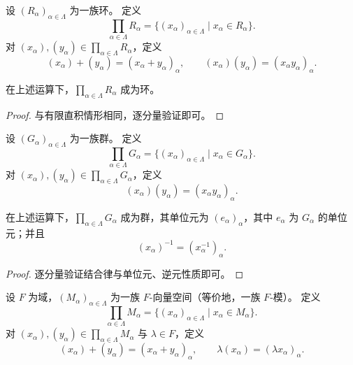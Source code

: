 \documentclass[lang=cn,a4paper,newtx]{elegantbook}
\begin{document}
\begin{definition}[一般直积环]
  设 $(R_{\alpha})_{\alpha\in\Lambda}$ 为一族环。
  定义
  \[
    \prod_{\alpha\in\Lambda} R_{\alpha}=\{(x_{\alpha})_{\alpha\in\Lambda}\mid x_{\alpha}\in R_{\alpha}\}.
  \]
  对 $(x_{\alpha}),(y_{\alpha})\in\prod_{\alpha\in\Lambda}R_{\alpha}$，定义
  \[
    (x_{\alpha})+(y_{\alpha})=(x_{\alpha}+y_{\alpha})_{\alpha},\qquad
    (x_{\alpha})(y_{\alpha})=(x_{\alpha}y_{\alpha})_{\alpha}.
  \]
\end{definition}

\begin{proposition}
  在上述运算下，$\prod_{\alpha\in\Lambda}R_{\alpha}$ 成为环。
\end{proposition}

\begin{proof}
  与有限直积情形相同，逐分量验证即可。
\end{proof}

\begin{definition}[直积群]
  设 $(G_{\alpha})_{\alpha\in\Lambda}$ 为一族群。
  定义
  \[
    \prod_{\alpha\in\Lambda} G_{\alpha}=\{(x_{\alpha})_{\alpha\in\Lambda}\mid x_{\alpha}\in G_{\alpha}\}.
  \]
  对 $(x_{\alpha}),(y_{\alpha})\in\prod_{\alpha\in\Lambda}G_{\alpha}$，定义
  \[
    (x_{\alpha})(y_{\alpha})=(x_{\alpha}y_{\alpha})_{\alpha}.
  \]
\end{definition}

\begin{proposition}
  在上述运算下，$\prod_{\alpha\in\Lambda} G_{\alpha}$ 成为群，其单位元为 $(e_{\alpha})_{\alpha}$，其中 $e_{\alpha}$ 为 $G_{\alpha}$ 的单位元；并且
  \[
    (x_{\alpha})^{-1}=(x_{\alpha}^{-1})_{\alpha}.
  \]
\end{proposition}

\begin{proof}
  逐分量验证结合律与单位元、逆元性质即可。
\end{proof}

\begin{definition}
  设 $F$ 为域，$(M_{\alpha})_{\alpha\in\Lambda}$ 为一族 $F$-向量空间（等价地，一族 $F$-模）。
  定义
  \[
    \prod_{\alpha\in\Lambda} M_{\alpha}=\{(x_{\alpha})_{\alpha\in\Lambda}\mid x_{\alpha}\in M_{\alpha}\}.
  \]
  对 $(x_{\alpha}),(y_{\alpha})\in\prod_{\alpha\in\Lambda}M_{\alpha}$ 与 $\lambda\in F$，定义
  \[
    (x_{\alpha})+(y_{\alpha})=(x_{\alpha}+y_{\alpha})_{\alpha},\qquad
    \lambda(x_{\alpha})=(\lambda x_{\alpha})_{\alpha}.
  \]
\end{definition}
\end{document}
